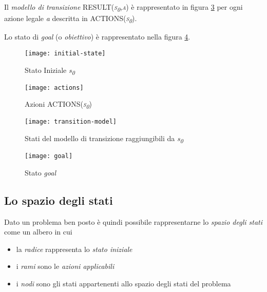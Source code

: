 Il \emph{modello di transizione} \textsc{RESULT(\emph{s\textsubscript{0}},\emph{a})} è rappresentato in figura \ref{tmodel} per ogni azione legale \emph{a} descritta in \textsc{ACTIONS(\emph{s\textsubscript{0}})}.

Lo stato di \emph{goal} (o \emph{obiettivo}) è rappresentato nella figura \ref{goal}.

\begin{figure}[!htbp]
  \begin{center}
    \leavevmode
      \texttt{[image: initial-state]}
    \caption{Stato Iniziale \emph{s\textsubscript{0}}}
    \label{stato-iniziale}
  \end{center}
\end{figure}


\begin{figure}[!htbp]
  \begin{center}
    \leavevmode
      \texttt{[image: actions]}
    \caption{Azioni \textsc{ACTIONS(\emph{s\textsubscript{0}})}}
    \label{azioni}
  \end{center}
\end{figure}



\begin{figure}[!htbp]
  \begin{center}
    \leavevmode
      \texttt{[image: transition-model]}
    \caption{Stati del modello di transizione raggiungibili da \emph{s\textsubscript{0}}}
    \label{tmodel}
  \end{center}
\end{figure}


\begin{figure}[!htbp]
  \begin{center}
    \leavevmode
      \texttt{[image: goal]}
    \caption{Stato \emph{goal}}
    \label{goal}
  \end{center}
\end{figure}



\subsection{Lo spazio degli stati}

Dato un problema ben posto è quindi possibile rappresentarne lo \emph{spazio degli stati} come un albero in cui
\begin{itemize}
   \item la \emph{radice} rappresenta lo \emph{stato iniziale}
   \item i \emph{rami} sono le \emph{azioni applicabili}
   \item i \emph{nodi} sono gli stati appartenenti allo spazio degli stati del problema
\end{itemize} 


